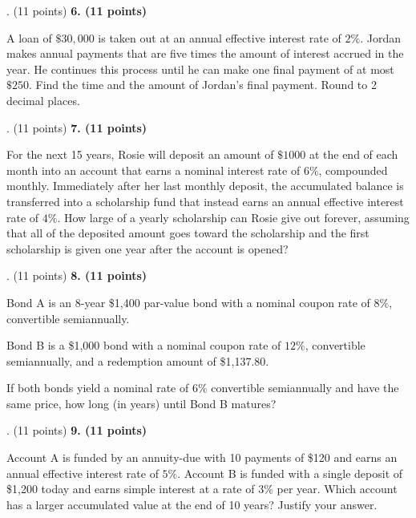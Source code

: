 \documentclass[12pt]{article}
\makeatletter
\newenvironment{problem}[1][]{%
  \bigskip%
  \noindent\begin{boxedminipage}{\columnwidth}%
  \def\@tempa{#1}%
  \ifx\@tempa\empty\else%
    \textbf{#1}\hspace{0.5em}%
  \fi%
}{%
  \end{boxedminipage}%
}
\makeatother
\begin{document}
\newpage

\begin{problem}[6. (11 points)]
A loan of $\$30{,}000$ is taken out at an annual effective interest rate of $2\%$.
Jordan makes annual payments that are five times the amount of interest accrued
in the year. He continues this process until he can make one final payment
of at most $\$250$. Find the time and the amount of Jordan's final payment.
Round to 2 decimal places.
\end{problem}

\newpage


\begin{problem}[7. (11 points)]
For the next 15 years, Rosie will
deposit an amount of $\$1000$ at the end of each month into an account that earns a
nominal interest rate of $6\%$, compounded monthly. Immediately after her
last monthly deposit, the accumulated balance is transferred into a scholarship fund
that instead earns an annual effective interest rate of $4\%$. How large of a yearly
scholarship can Rosie give out forever, assuming that all of the deposited amount
goes toward the scholarship and the first scholarship is given one year after the account is opened?
\end{problem}

\newpage


\begin{problem}[8. (11 points)]
Bond A is an $8$-year \$1{,}400 par-value bond with a nominal coupon rate of $8\%$,
convertible semiannually. 

\vspace{.25cm}

Bond B is a \$1{,}000 bond with a nominal coupon rate of $12\%$, convertible
semiannually, and a redemption amount of \$1{,}137.80. 

\vspace{.25cm}

If both bonds yield a nominal
rate of $6\%$ convertible semiannually and have the same price, how long (in years) until Bond B matures?
\end{problem}


\newpage


\begin{problem}[9. (11 points)]
Account A is funded by an annuity-due with 10 payments of \$120 and earns an annual
effective interest rate of $5\%$. Account B is funded with a single deposit of \$1{,}200 today and earns simple interest at a rate of $3\%$ per year. Which account has a larger accumulated value at the end of 10 years? Justify your
answer.
\end{problem}
\end{document}
